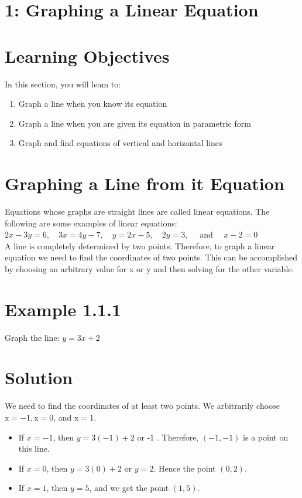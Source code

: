 \section*{1: Graphing a Linear Equation}
\section*{Learning Objectives}
In this section, you will leam to:

\begin{enumerate}
  \item Graph a line when you know its equation
  \item Graph a line when you are given its equation in parametric form
  \item Graph and find equations of vertical and horizontal lines
\end{enumerate}

\section*{Graphing a Line from it Equation}
Equations whose graphs are straight lines are called linear equations. The following are some examples of linear equations:\\
$2 x-3 y=6, \quad 3 x=4 y-7, \quad y=2 x-5, \quad 2 y=3, \quad$ and $\quad x-2=0$\\
A line is completely determined by two points. Therefore, to graph a linear equation we need to find the coordinates of two points. This can be accomplished by choosing an arbitrary value for x or y and then solving for the other variable.

\section*{Example 1.1.1}
Graph the line: $y=3 x+2$

\section*{Solution}
We need to find the coordinates of at least two points. We arbitrarily choose $\mathrm{x}=-1, \mathrm{x}=0$, and $\mathrm{x}=1$.

\begin{itemize}
  \item If $x=-1$, then $y=3(-1)+2$ or -1 . Therefore, $(-1,-1)$ is a point on this line.
  \item If $x=0$, then $y=3(0)+2$ or $y=2$. Hence the point $(0,2)$.
  \item If $x=1$, then $y=5$, and we get the point $(1,5)$.
\end{itemize}

